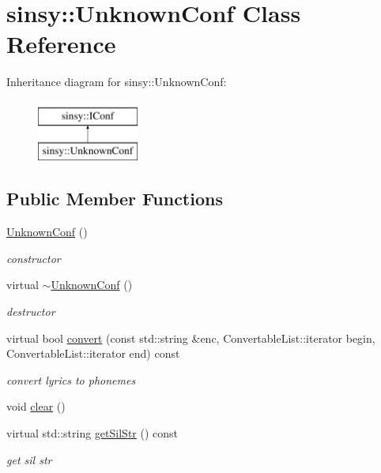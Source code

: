 \hypertarget{classsinsy_1_1UnknownConf}{\section{sinsy\-:\-:\-Unknown\-Conf \-Class \-Reference}
\label{classsinsy_1_1UnknownConf}
}
\-Inheritance diagram for sinsy\-:\-:\-Unknown\-Conf\-:\begin{figure}[H]
\begin{center}
\leavevmode
\includegraphics[height=2.000000cm]{classsinsy_1_1UnknownConf}
\end{center}
\end{figure}
\subsection*{\-Public \-Member \-Functions}
\begin{DoxyCompactItemize}
\item 
\hypertarget{classsinsy_1_1UnknownConf_a600c23683bb17dcc8c9f3481c7a097e4}{\hyperlink{classsinsy_1_1UnknownConf_a600c23683bb17dcc8c9f3481c7a097e4}{\-Unknown\-Conf} ()}\label{classsinsy_1_1UnknownConf_a600c23683bb17dcc8c9f3481c7a097e4}

\begin{DoxyCompactList}\small\item\em constructor \end{DoxyCompactList}\item 
\hypertarget{classsinsy_1_1UnknownConf_aa2f609daa15caa8cc9b76a04f90f9b84}{virtual \hyperlink{classsinsy_1_1UnknownConf_aa2f609daa15caa8cc9b76a04f90f9b84}{$\sim$\-Unknown\-Conf} ()}\label{classsinsy_1_1UnknownConf_aa2f609daa15caa8cc9b76a04f90f9b84}

\begin{DoxyCompactList}\small\item\em destructor \end{DoxyCompactList}\item 
virtual bool \hyperlink{classsinsy_1_1UnknownConf_aa3716c61e71716facd6b4ee74ad65f35}{convert} (const std\-::string \&enc, \-Convertable\-List\-::iterator begin, \-Convertable\-List\-::iterator end) const 
\begin{DoxyCompactList}\small\item\em convert lyrics to phonemes \end{DoxyCompactList}\item 
void \hyperlink{classsinsy_1_1UnknownConf_a192c80d61f64237d6efde75fa2979298}{clear} ()
\item 
virtual std\-::string \hyperlink{classsinsy_1_1UnknownConf_a011e2150d42ec96f593a3ee730430c2e}{get\-Sil\-Str} () const 
\begin{DoxyCompactList}\small\item\em get sil str \end{DoxyCompactList}\end{DoxyCompactItemize}


